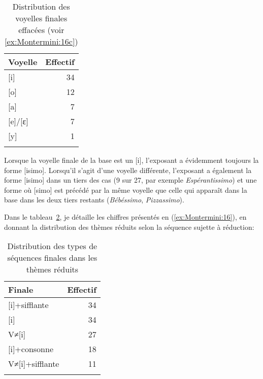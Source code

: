 \documentclass[output=paper]{langsci/langscibook}
\begin{document}
\begin{table}[h]
\centering
\begin{tabular}{lr}
\lsptoprule
Voyelle & Effectif\\
\midrule
{}[i] & 34\\
{}[o] & 12\\
{}[a] &7\\
{}[e]/[ɛ] &7\\
{}[y] &1\\
\lspbottomrule
\end{tabular}
\caption{\label{ex:Montermini:18} Distribution des voyelles finales effacées (voir \ref{ex:Montermini:16c})}
\end{table}


Lorsque la voyelle finale de la base est un {[}i{]}, l'exposant a
évidemment toujours la forme {[}isimo{]}. Lorsqu'il s'agit d'une voyelle
différente, l'exposant a également la forme {[}isimo{]} dans un tiers
des cas (9 sur 27, par exemple \emph{Espérantissimo}) et une forme où
{[}simo{]} est précédé par la même voyelle que celle qui apparaît dans
la base dans les deux tiers restants (\emph{Bébéssimo},
\emph{Pizzassimo}).

Dans le tableau~\ref{ex:Montermini:19}, je détaille les chiffres présentés en (\ref{ex:Montermini:16}), en donnant la
distribution des thèmes réduits selon la séquence sujette à réduction:

\begin{table}[h]
\centering
\begin{tabular}{lr}
\lsptoprule
Finale & Effectif\\
\midrule
{[}i{]}+sifflante &34\\
{[}i{]} &34\\
V≠{[}i{]} &27\\
{[}i{]}+consonne &18\\
V≠{[}i{]}+sifflante &11\\
\lspbottomrule
\end{tabular}
\caption{\label{ex:Montermini:19} Distribution des types de séquences finales dans les thèmes réduits}
\end{table}
\end{document}

